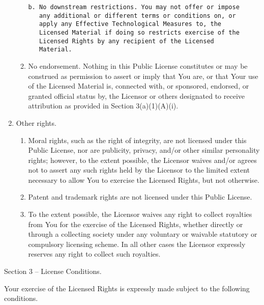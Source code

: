 \documentclass[]{article}
\begin{document}
\begin{enumerate}
\begin{enumerate}
\begin{verbatim}
b. No downstream restrictions. You may not offer or impose
   any additional or different terms or conditions on, or
   apply any Effective Technological Measures to, the
   Licensed Material if doing so restricts exercise of the
   Licensed Rights by any recipient of the Licensed
   Material.
\end{verbatim}
  \item
    No endorsement. Nothing in this Public License constitutes or may be
    construed as permission to assert or imply that You are, or that
    Your use of the Licensed Material is, connected with, or sponsored,
    endorsed, or granted official status by, the Licensor or others
    designated to receive attribution as provided in Section
    3(a)(1)(A)(i).
  \end{enumerate}
\item
  Other rights.

  \begin{enumerate}
  \def\labelenumii{\arabic{enumii}.}
  \item
    Moral rights, such as the right of integrity, are not licensed under
    this Public License, nor are publicity, privacy, and/or other
    similar personality rights; however, to the extent possible, the
    Licensor waives and/or agrees not to assert any such rights held by
    the Licensor to the limited extent necessary to allow You to
    exercise the Licensed Rights, but not otherwise.
  \item
    Patent and trademark rights are not licensed under this Public
    License.
  \item
    To the extent possible, the Licensor waives any right to collect
    royalties from You for the exercise of the Licensed Rights, whether
    directly or through a collecting society under any voluntary or
    waivable statutory or compulsory licensing scheme. In all other
    cases the Licensor expressly reserves any right to collect such
    royalties.
  \end{enumerate}
\end{enumerate}

Section 3 -- License Conditions.

Your exercise of the Licensed Rights is expressly made subject to the
following conditions.
\end{document}
